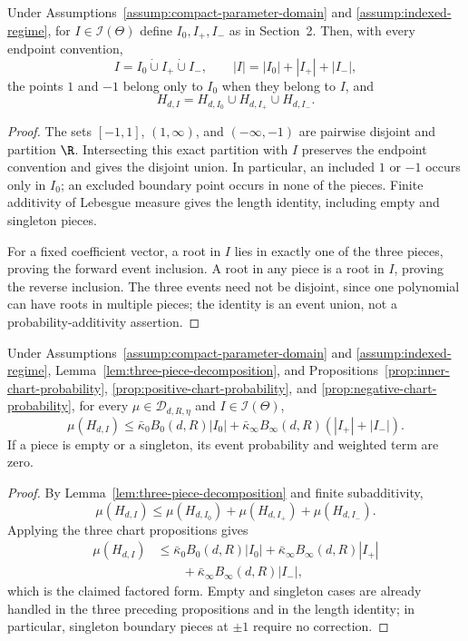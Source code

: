 \begin{lemma}
\label{lem:three-piece-decomposition}
Under Assumptions~\ref{assump:compact-parameter-domain} and
\ref{assump:indexed-regime}, for $I\in\mathcal I(\Theta)$ define
$I_0,I_+,I_-$ as in Section~2.  Then, with every endpoint convention,
\[
I=I_0\mathbin{\dot\cup}I_+\mathbin{\dot\cup}I_-,
\qquad
|I|=|I_0|+|I_+|+|I_-|,
\]
the points $1$ and $-1$ belong only to $I_0$ when they belong to $I$, and
\[
H_{d,I}=H_{d,I_0}\cup H_{d,I_+}\cup H_{d,I_-}.
\]
\end{lemma}

\begin{proof}
The sets $[-1,1]$, $(1,\infty)$, and $(-\infty,-1)$ are pairwise disjoint
and partition $\R$.  Intersecting this exact partition with $I$ preserves
the endpoint convention and gives the disjoint union.  In particular, an
included $1$ or $-1$ occurs only in $I_0$; an excluded boundary point occurs
in none of the pieces.  Finite additivity of Lebesgue measure gives the
length identity, including empty and singleton pieces.

For a fixed coefficient vector, a root in $I$ lies in exactly one of the
three pieces, proving the forward event inclusion.  A root in any piece is a
root in $I$, proving the reverse inclusion.  The three events need not be
disjoint, since one polynomial can have roots in multiple pieces; the identity
is an event union, not a probability-additivity assertion.
\end{proof}

\begin{proposition}
\label{prop:weighted-chart-bound}
Under Assumptions~\ref{assump:compact-parameter-domain} and
\ref{assump:indexed-regime}, Lemma~\ref{lem:three-piece-decomposition}, and
Propositions~\ref{prop:inner-chart-probability},
\ref{prop:positive-chart-probability}, and
\ref{prop:negative-chart-probability}, for every
$\mu\in\mathcal D_{d,R,\eta}$ and $I\in\mathcal I(\Theta)$,
\[
\mu(H_{d,I})
\leq\bar\kappa_0B_0(d,R)|I_0|
 +\bar\kappa_\infty B_\infty(d,R)(|I_+|+|I_-|).
\]
If a piece is empty or a singleton, its event probability and weighted term
are zero.
\end{proposition}

\begin{proof}
By Lemma~\ref{lem:three-piece-decomposition} and finite subadditivity,
\[
\mu(H_{d,I})
\leq\mu(H_{d,I_0})+\mu(H_{d,I_+})+\mu(H_{d,I_-}).
\]
Applying the three chart propositions gives
\[
\begin{aligned}
\mu(H_{d,I})
&\leq\bar\kappa_0B_0(d,R)|I_0|
 +\bar\kappa_\infty B_\infty(d,R)|I_+|\\
&\qquad+\bar\kappa_\infty B_\infty(d,R)|I_-|,
\end{aligned}
\]
which is the claimed factored form.  Empty and singleton cases are already
handled in the three preceding propositions and in the length identity; in
particular, singleton boundary pieces at $\pm1$ require no correction.
\end{proof}

